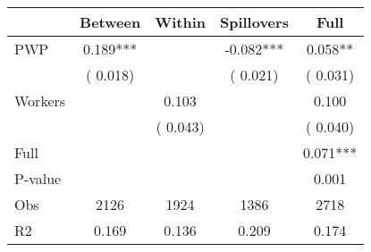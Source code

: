 
\begin{tabular}{l*{4}{c}}\hline&\multicolumn{1}{c}{Between}&\multicolumn{1}{c}{Within}&\multicolumn{1}{c}{Spillovers}&\multicolumn{1}{c}{Full}\\ \hline
 PWP           &              0.189***      &                                               &       -0.082*** &         0.058**                            \\ 
                               &        (       0.018)           &                                       &       (       0.021)     &      (       0.031)                                           \\ 
 Workers       &                                               &        0.103    &                                &             0.100                            \\ 
                               &                                               & (       0.043)                  &                                        &      (       0.040)                                           \\ 
\hline                                                                                                                                                                                                                                            
 Full                  &                                               &                                               &                                        &             0.071***                                     \\ 
 P-value               &                                               &                                               &                                        &             0.001                                           \\ 
 Obs                   &               2126               &       1924                       &       1386                &              2718                                               \\ 
 R2                    &                      0.169              &              0.136                      &              0.209               &                     0.174                                              \\ 
\hline \end{tabular}                                                                                                                                                                                                              